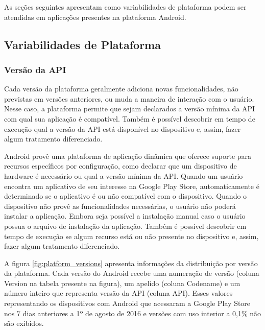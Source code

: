 As seções seguintes apresentam como variabilidades de plataforma podem ser atendidas
em aplicações presentes na plataforma Android.

\subsection{Variabilidades de Plataforma}

\subsubsection{Versão da API}

Cada versão da plataforma geralmente adiciona novas funcionalidades, não previstas
em versões anteriores, ou muda a maneira de interação com o usuário. Nesse caso,
a plataforma permite que sejam declarados a versão mínima da API com qual sua
aplicação é compatível. Também é possível descobrir em tempo de execução qual a
versão da API está disponível no dispositivo e, assim, fazer algum tratamento diferenciado.

Android provê uma plataforma de aplicação dinâmica que oferece suporte para recursos
específicos por configuração, como declarar que um dispositivo de hardware é necessário
ou qual a versão mínima da API. Quando um usuário encontra um aplicativo de seu interesse
na Google Play Store, automaticamente é determinado se o aplicativo é ou não compatível
com o dispositivo. Quando o dispositivo não provê as funcionalidades necessárias,
o usuário não poderá instalar a aplicação. Embora seja possível a instalação manual
caso o usuário possua o arquivo de instalação da aplicação. Também é possível descobrir
em tempo de execução se algum recurso está ou não presente no dispositivo e, assim,
fazer algum tratamento diferenciado.

A figura \ref{fig:platform_versions} apresenta informações da distribuição por versão
da plataforma.
Cada versão do Android recebe uma numeração de versão (coluna Version na tabela
presente na figura), um apelido (coluna Codename) e um número inteiro que representa
versão da API (coluna API). Esses valores representando os dispositivos com Android
que acessaram a Google Play Store nos 7 dias anteriores a 1º de agosto de 2016 e
versões com uso interior a 0,1\% não são exibidos. 

